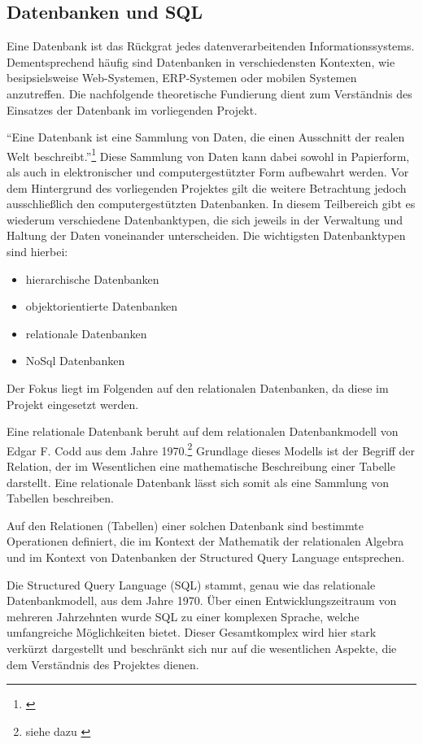 \subsection{Datenbanken und SQL}
\label{sec:DatenbankenUndSql}

Eine Datenbank ist das Rückgrat jedes datenverarbeitenden Informationssystems.
Dementsprechend häufig sind Datenbanken in verschiedensten Kontexten, wie
besipsielsweise Web-Systemen, ERP-Systemen oder mobilen Systemen anzutreffen.
Die nachfolgende theoretische Fundierung dient zum Verständnis des Einsatzes der
Datenbank im vorliegenden Projekt.

"`Eine Datenbank ist eine Sammlung von Daten, die einen Ausschnitt der realen
Welt beschreibt."'\footnote{\citet[S.~18]{elmasri2009}} Diese Sammlung von Daten
kann dabei sowohl in Papierform, als auch in elektronischer und
computergestützter Form aufbewahrt werden. Vor dem Hintergrund des vorliegenden
Projektes gilt die weitere Betrachtung jedoch ausschließlich den
computergestützten Datenbanken. In diesem Teilbereich gibt es wiederum
verschiedene Datenbanktypen, die sich jeweils in der Verwaltung und Haltung der
Daten voneinander unterscheiden. Die wichtigsten Datenbanktypen sind hierbei:

\begin{itemize}
  \item hierarchische Datenbanken
  \item objektorientierte Datenbanken
  \item relationale Datenbanken
  \item NoSql Datenbanken
\end{itemize}

Der Fokus liegt im Folgenden auf den relationalen Datenbanken, da diese im
Projekt eingesetzt werden.

Eine relationale Datenbank beruht auf dem relationalen Datenbankmodell von
Edgar F. Codd aus dem Jahre 1970.\footnote{siehe dazu \citet{codd1970}}
Grundlage dieses Modells ist der Begriff der Relation, der im Wesentlichen eine
mathematische Beschreibung einer Tabelle darstellt. Eine relationale Datenbank
lässt sich somit als eine Sammlung von Tabellen beschreiben.

Auf den Relationen (Tabellen) einer solchen Datenbank sind bestimmte
Operationen definiert, die im Kontext der Mathematik der relationalen Algebra
und im Kontext von Datenbanken der Structured Query Language entsprechen.

Die Structured Query Language (SQL) stammt, genau wie das relationale
Datenbankmodell, aus dem Jahre 1970. Über einen Entwicklungszeitraum von
mehreren Jahrzehnten wurde SQL zu einer komplexen Sprache, welche umfangreiche
Möglichkeiten bietet. Dieser Gesamtkomplex wird hier stark verkürzt dargestellt
und beschränkt sich nur auf die wesentlichen Aspekte, die dem Verständnis des
Projektes dienen.

